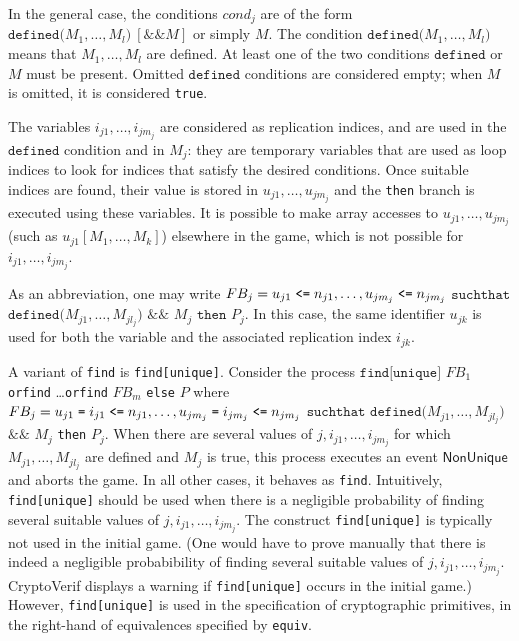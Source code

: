 \begin{itemize}
In the general case, the conditions $cond_j$ are of the form
$\texttt{defined(}M_1, \ldots, M_l\texttt{)}\ [\texttt{\&\& }M]$ or simply $M$.
The condition $\texttt{defined(}M_1, \ldots, M_l\texttt{)}$ means that
$M_1, \ldots, M_l$ are defined.
At least one of the two conditions $\texttt{defined}$ or $M$ must be
present. Omitted $\texttt{defined}$ conditions are considered empty;
when $M$ is omitted, it is considered \texttt{true}. 

The variables $i_{j1}, \ldots, i_{jm_j}$ are considered as replication indices, and are used in the $\texttt{defined}$ condition and in $M_j$: they are temporary variables that are used as loop indices to look for indices that satisfy the desired conditions. Once suitable indices are found, their value is stored in $u_{j1}, \ldots, u_{jm_j}$ and the \texttt{then} branch is executed using these variables. It is possible to make array accesses to $u_{j1}, \ldots, u_{jm_j}$ (such as $u_{j1}[M_1, \ldots, M_k]$) elsewhere in the game, which is not possible for $i_{j1}, \ldots, i_{jm_j}$.

As an abbreviation, one may write $FB_j = u_{j1} \mathrel{\texttt{<=}}  n_{j1}, \ldots, u_{jm_j} \mathrel{\texttt{<=}}  n_{jm_j}$ $\texttt{suchthat}$ $\texttt{defined(}M_{j1}, \allowbreak\ldots,\allowbreak M_{jl_j}\texttt{)}$ $\&\&$ $M_j$ $\texttt{then}$ $P_j$. In this case, the same identifier $u_{jk}$ is used for both the variable and the associated replication index $i_{jk}$.


A variant of {\tt find} is {\tt find[unique]}. 
Consider the process 
$\texttt{find[unique]}$ $FB_1$ \texttt{orfind} \ldots \texttt{orfind} $FB_m$ \texttt{else} $P$
where $FB_j = u_{j1} \mathrel{\texttt{=}}  i_{j1} \mathrel{\texttt{<=}}  n_{j1}, \ldots, u_{jm_j} \mathrel{\texttt{=}}  i_{jm_j} \mathrel{\texttt{<=}}  n_{jm_j}$ $\texttt{suchthat}$ $\texttt{defined(}M_{j1},\allowbreak \ldots, \allowbreak M_{jl_j}\texttt{)}$ $\texttt{\&\&}$ $M_j$ \texttt{then} $P_j$.
When there are several values of $j, i_{j1}, \ldots, i_{jm_j}$ for which 
$M_{j1}, \ldots, M_{jl_j}$ are defined and $M_j$ is true, this process executes an event $\mathsf{NonUnique}$ and aborts the game. In all other cases, it behaves as {\tt find}.
Intuitively, {\tt find[unique]} should be used when there is a negligible probability of finding several suitable values of $j, i_{j1}, \ldots, i_{jm_j}$. The construct {\tt find[unique]} is typically not used in the initial game. (One would have to prove manually that there is indeed a negligible probabibility of finding several suitable values of $j, i_{j1}, \ldots, i_{jm_j}$. CryptoVerif displays a warning if {\tt find[unique]} occurs in the initial game.) However, {\tt find[unique]} is used in the specification of cryptographic primitives, in the right-hand of equivalences specified by \texttt{equiv}. 


\end{itemize}
